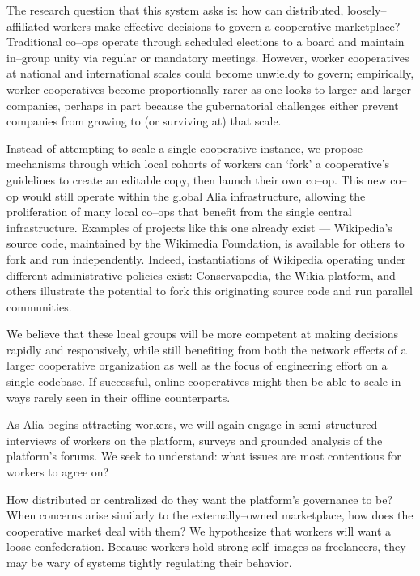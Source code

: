 \documentclass[11pt]{article}
\begin{document}
The research question that this system asks is: how can distributed, loosely--affiliated workers make effective decisions to govern a cooperative marketplace?
Traditional co--ops operate through scheduled elections to a board and maintain in--group unity via regular or mandatory meetings.
However, worker cooperatives at national and international scales could become unwieldy to govern; empirically, worker cooperatives become proportionally rarer as one looks to larger and larger companies, perhaps in part because the gubernatorial challenges either prevent companies from growing to
(or surviving at)
that scale.

Instead of attempting to scale a single cooperative instance, we propose mechanisms through which local cohorts of workers can `fork' a cooperative's guidelines to create an editable copy, then launch their own co--op.
This new co--op would still operate within the global Alia infrastructure, allowing the proliferation of many local co--ops that benefit from the single central infrastructure.
Examples of projects like this one already exist 
--- Wikipedia's source code, maintained by the Wikimedia Foundation, is available for others to fork and run independently.
Indeed, instantiations of Wikipedia operating under different administrative policies exist: Conservapedia, the Wikia platform, and others illustrate the potential to fork this originating source code and run parallel communities.

We believe that these local groups will be more competent at making decisions rapidly and responsively, while still benefiting from both the network effects of a larger cooperative organization as well as the focus of engineering effort on a single codebase.
If successful, online cooperatives might then be able to scale in ways rarely seen in their offline counterparts.

As Alia begins attracting workers, we will again engage in semi--structured interviews of workers on the platform, surveys and grounded analysis of the platform's forums.
We seek to understand: what issues are most contentious for workers to agree on?

How distributed or centralized do they want the platform's governance to be?
When concerns arise similarly to the externally--owned marketplace, how does the cooperative market deal with them?
We hypothesize that workers will want a loose confederation.
Because workers hold strong self--images as freelancers, they may be wary of systems tightly regulating their behavior.
\end{document}
